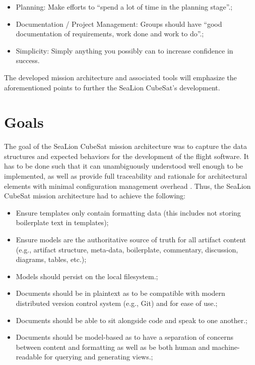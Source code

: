 \documentclass[journal,article,submit,pdftex,moreauthors]{Definitions/mdpi}
\begin{document}
\begin{itemize}
	\item	Planning: Make efforts to “spend a lot of time in the planning stage”.;
	\item	Documentation / Project Management: Groups should have “good documentation of requirements, work done and work to do”.;
	\item	Simplicity: Simply anything you possibly can to increase confidence in success.
\end{itemize}

The developed mission architecture and associated tools will emphasize the aforementioned points to further the SeaLion CubeSat's development.

\section{Goals}

The goal of the SeaLion CubeSat mission architecture was to capture the data structures and expected behaviors for the development of the flight software.  It has to be done such that it can unambiguously understood well enough to be implemented, as well as provide full traceability and rationale for architectural elements with minimal configuration management overhead \cite{sealion_mission_architecture}.  Thus, the SeaLion CubeSat mission architecture had to achieve the following:

\begin{itemize}
	\item	Ensure templates only contain formatting data (this includes not storing boilerplate text in templates);
	\item	Ensure models are the authoritative source of truth for all artifact content (e.g., artifact structure, meta-data, boilerplate, commentary, discussion, diagrams, tables, etc.);
	\item 	Models should persist on the local filesystem.;
	\item 	Documents should be in plaintext as to be compatible with modern distributed version control system (e.g., Git) and for ease of use.;
	\item 	Documents should be able to sit alongside code and speak to one another.;
	\item 	Documents should be model-based as to have a separation of concerns between content and formatting as well as be both human and machine-readable for querying and generating views.;
\end{itemize}
\end{document}
